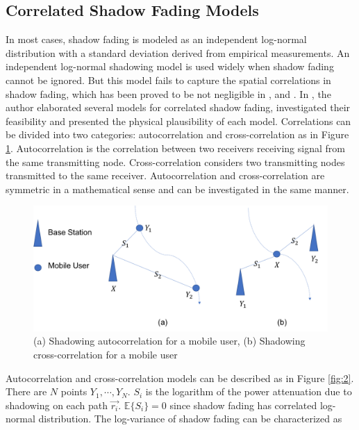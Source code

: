 \subsection{Correlated Shadow Fading Models}
\label{subsec:2}
\par In most cases, shadow fading is modeled as an independent log-normal distribution \cite{goldsmith2005wireless} with a standard deviation derived from empirical measurements. An independent log-normal shadowing model is used widely when shadow fading cannot be ignored. But this model fails to capture the spatial correlations in shadow fading, which has been proved to be not negligible in \cite{graziano1978propagation}, \cite{marsan1990shadowing} and \cite{liberti1992statistics}. In \cite{szyszkowicz2010feasibility}, the author elaborated several models for correlated shadow fading,  investigated their feasibility and presented the physical plausibility of each model. Correlations can be divided into two categories: autocorrelation and cross-correlation as in Figure \ref{fig:1}. Autocorrelation is the correlation between two receivers receiving signal from the same transmitting node. Cross-correlation considers two transmitting nodes transmitted to the same receiver. Autocorrelation and cross-correlation are symmetric in a mathematical sense and can be investigated in the same manner.
\begin{figure} 
\centering
\includegraphics[width=14cm]{correlation.png}
\caption{(a) Shadowing autocorrelation for a mobile user, (b) Shadowing cross-correlation for a mobile user}
\label{fig:1}
\end{figure}
\par Autocorrelation and cross-correlation models can be described as in Figure \ref{fig:2}. There are $N$ points $Y_{1}, \cdots, Y_{N}$.  $S_{i}$ is the logarithm of the power attenuation due to shadowing on each path $\vec{r_{i}}$. $\mathbb{E}\{S_{i}\} = 0$ since shadow fading has correlated log-normal distribution. The log-variance of shadow fading can be characterized as 
